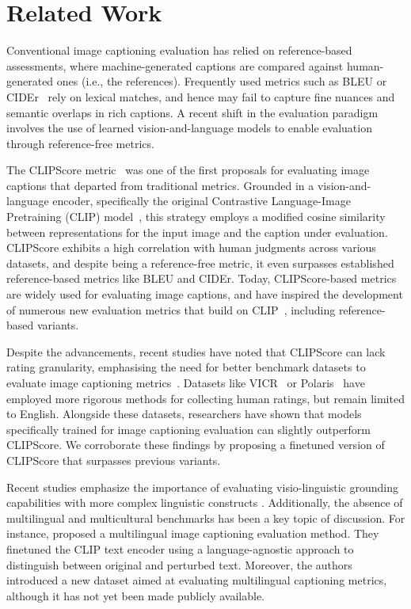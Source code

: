\section{Related Work}
Conventional image captioning evaluation has relied on reference-based assessments, where machine-generated captions are compared against human-generated ones (i.e., the references). 
Frequently used metrics such as BLEU or CIDEr~\cite{vedantam2015cider}  rely on lexical matches, and hence may fail to capture fine nuances and semantic overlaps in rich captions. A recent shift in the evaluation paradigm involves the use of learned vision-and-language models to enable evaluation through reference-free metrics.

The CLIPScore metric~\cite{hessel2021clipscore} was one of the first proposals for evaluating image captions that departed from traditional metrics. Grounded in a vision-and-language encoder, specifically the original Contrastive Language-Image Pretraining (CLIP) model~\cite{radford2021learning}, this strategy employs a modified cosine similarity between representations for the input image and the caption under evaluation. CLIPScore exhibits a high correlation with human judgments across various datasets, and despite being a reference-free metric, it even surpasses established reference-based metrics like BLEU and CIDEr. Today, CLIPScore-based metrics are widely used for evaluating image captions, and have inspired the development of numerous new evaluation metrics that build on CLIP~\cite{sarto2023positive,hu2023infometic,kim2022mutual}, including reference-based variants.

Despite the advancements, recent studies have noted that CLIPScore can lack rating granularity, emphasising the need for better benchmark datasets to evaluate image captioning metrics~\cite{ahmadi2024examination}. Datasets like VICR~\cite{narins2024validated} or Polaris~\cite{wada2024polos} have employed more rigorous methods for collecting human ratings, but remain limited to English. Alongside these datasets, researchers have shown that models specifically trained for image captioning evaluation can slightly outperform CLIPScore. We corroborate these findings by proposing a finetuned version of CLIPScore that surpasses previous variants.

Recent studies emphasize the importance of evaluating visio-linguistic grounding capabilities with more complex linguistic constructs \cite{parcalabescu2022valse}. Additionally, the absence of multilingual and multicultural benchmarks has been a key topic of discussion. For instance, \citet{kim2023pr} proposed a multilingual image captioning evaluation method. They finetuned the CLIP text encoder using a language-agnostic approach to distinguish between original and perturbed text. Moreover, the authors introduced a new dataset aimed at evaluating multilingual captioning metrics, although it has not yet been made publicly available.

